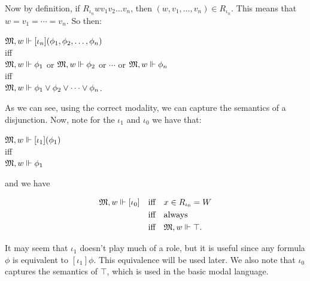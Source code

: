 \par Now by definition, if $R_{\iota_n}wv_1v_2\ldots v_{n}$, then $(w,v_1,\ldots,v_n) \in R_{\iota_n}.$ This means that  $w=v_1=\cdots=v_n$. So then:

\begin{center}

    $\mathfrak{M}, w \Vdash [\iota_n](\phi_1, \phi_2, \ldots, \phi_{n})$\\

    iff\\


    $\mathfrak{M}, w\Vdash\phi_1$ or $\mathfrak{M}, w\Vdash\phi_2$ or $\cdots$ or $\mathfrak{M}, w\Vdash\phi_{n}$\\

    iff\\

    $\mathfrak{M}, w \Vdash \phi_1 \vee \phi_2 \vee \cdots \vee \phi_n$.

\end{center}



\par As we can see, using the correct modality, we can capture the semantics of a disjunction. Now, note for the $\iota_1$ and $\iota_0$ we have that:

\begin{center}

    $\mathfrak{M}, w \Vdash [\iota_1](\phi_1)$\\

    iff\\

    $\mathfrak{M}, w \Vdash \phi_1$

\end{center}

\par and we have

\begin{align*}
    \mathfrak{M}, w \Vdash [\iota_0] \quad &\text{iff} \quad x\in R_{\iota_0} = W\\
    &\text{iff} \quad \text{always}\\
    &\text{iff} \quad \mathfrak{M}, w \Vdash \top.
\end{align*}

\par It may seem that $\iota_1$ doesn't play much of a role, but it is useful since any formula $\phi$ is equivalent to $[\iota_1]\phi$. This equivalence will be used later. We also note that $\iota_0$ captures the semantics of $\top$, which is used in the basic modal language.


